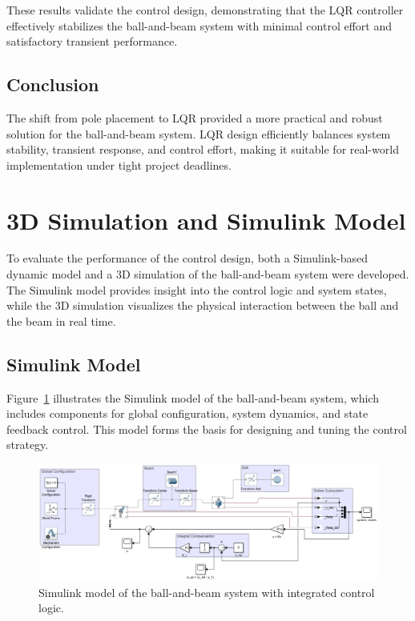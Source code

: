 \documentclass[conference]{IEEEtran}
\begin{document}
These results validate the control design, demonstrating that the LQR controller effectively stabilizes the ball-and-beam system with minimal control effort and satisfactory transient performance.


\subsection{Conclusion}
\label{control_conclusion}
The shift from pole placement to LQR provided a more practical and robust solution for the ball-and-beam system. LQR design efficiently balances system stability, transient response, and control effort, making it suitable for real-world implementation under tight project deadlines.

\section{3D Simulation and Simulink Model}
\label{sec:simulation_model}

To evaluate the performance of the control design, both a Simulink-based dynamic model and a 3D simulation of the ball-and-beam system were developed. The Simulink model provides insight into the control logic and system states, while the 3D simulation visualizes the physical interaction between the ball and the beam in real time.

\subsection{Simulink Model}
\label{subsec:simulink_model}

Figure~\ref{fig:simulink_model} illustrates the Simulink model of the ball-and-beam system, which includes components for global configuration, system dynamics, and state feedback control. This model forms the basis for designing and tuning the control strategy.

\begin{figure}[H]
    \centering
    \includegraphics[width=\linewidth]{figures/simulink_model.png}
    \caption[]{Simulink model of the ball-and-beam system with integrated control logic.}
    \label{fig:simulink_model}
\end{figure}
\end{document}
